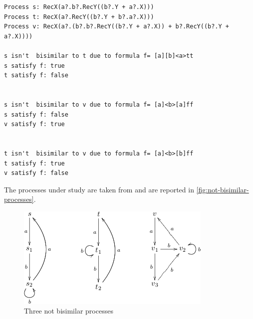 \begin{verbatim}
Process s: RecX(a?.b?.RecY((b?.Y + a?.X)))
Process t: RecX(a?.RecY((b?.Y + b?.a?.X)))
Process v: RecX(a?.(b?.b?.RecY((b?.Y + a?.X)) + b?.RecY((b?.Y + a?.X))))

s isn't  bisimilar to t due to formula f= [a][b]<a>tt
s satisfy f: true
t satisfy f: false


s isn't  bisimilar to v due to formula f= [a]<b>[a]ff
s satisfy f: false
v satisfy f: true


t isn't  bisimilar to v due to formula f= [a]<b>[b]ff
t satisfy f: true
v satisfy f: false
\end{verbatim}
The processes under study are taken from \cite{1324845} and are
reported in \autoref{fig:not-bisimilar-processes}.
\begin{figure}[htb]
  \centering
  \includegraphics{qualitative-project/not-bisimilar-processes.png}
  \caption{Three not bisimilar processes}
  \label{fig:not-bisimilar-processes}
\end{figure}
